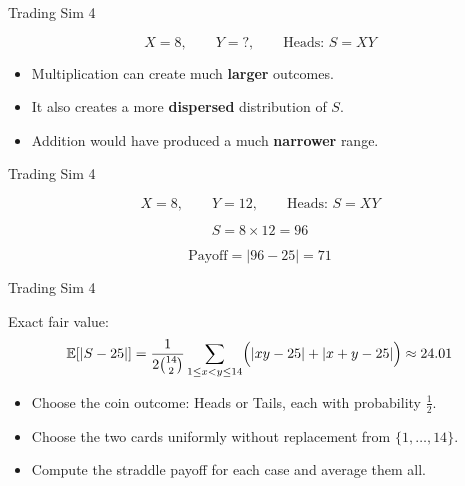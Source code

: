 \begin{frame}{Trading Sim 4}
  \begin{center}
    \[
      X=8,\qquad Y=?,\qquad \text{Heads: } S=XY
    \]
  \end{center}

  \begin{itemize}
    \item Multiplication can create much \textbf{larger} outcomes.
    \item It also creates a more \textbf{dispersed} distribution of $S$.
    \item Addition would have produced a much \textbf{narrower} range.
  \end{itemize}

\end{frame}

\begin{frame}{Trading Sim 4}
  \begin{center}
    \[
      X=8,\qquad Y=12,\qquad \text{Heads: } S=XY
    \]

    \vspace{0.2cm}
    \[
      S = 8\times 12 = 96
    \]

    \vspace{0.2cm}
    \[
      \text{Payoff} = |96-25| = 71
    \]
  \end{center}
\end{frame}

\begin{frame}{Trading Sim 4}
  \begin{sqt:definition}
    Exact fair value:
    \[
      \mathbb{E}[|S-25|]
      =
      \frac{1}{2\binom{14}{2}}
      \sum_{1\le x<y\le 14}
      \Bigl(|xy-25| + |x+y-25|\Bigr)
      \approx 24.01
    \]
  \end{sqt:definition}

  \begin{itemize}
    \item Choose the coin outcome: Heads or Tails, each with probability $\frac12$.
    \item Choose the two cards uniformly without replacement from $\{1,\dots,14\}$.
    \item Compute the straddle payoff for each case and average them all.
  \end{itemize}
\end{frame}



